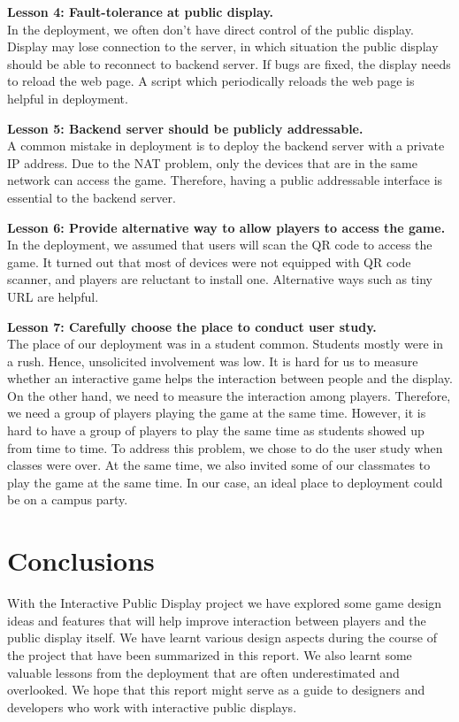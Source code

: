 \documentclass{sig-alternate}
\begin{document}
\textbf{Lesson 4: Fault-tolerance at public display.}\\
In the deployment, we often don't have direct control of the public display. Display may lose connection to the server, in which situation the public display should be able to reconnect to backend server. If bugs are fixed, the display needs to reload the web page. A script which periodically reloads the web page is helpful in deployment.

\textbf{Lesson 5: Backend server should be publicly addressable.}\\
A common mistake in deployment is to deploy the backend server with a private IP address. Due to the NAT problem, only the devices that are in the same network can access the game. Therefore, having a public addressable interface is essential to the backend server.

\textbf{Lesson 6: Provide alternative way to allow players to access the game.}\\
In the deployment, we assumed that users will scan the QR code to access the game. It turned out that most of devices were not equipped with QR code scanner, and players are reluctant to install one. Alternative ways such as tiny URL are helpful. 

\textbf{Lesson 7: Carefully choose the place to conduct user study.}\\
The place of our deployment was in a student common. Students mostly were in a rush. Hence, unsolicited involvement was low. It is hard for us to measure whether an interactive game helps the interaction between people and the display. On the other hand, we need to measure the interaction among players. Therefore, we need a group of players playing the game at the same time. However, it is hard to have a group of players to play the same time as students showed up from time to time. To address this problem, we chose to do the user study when classes were over. At the same time, we also invited some of our classmates to play the game at the same time. In our case, an ideal place to deployment could be on a campus party.

\section{Conclusions}
With the Interactive Public Display project we have explored some game design ideas and features that will help improve interaction between players and the public display itself. We have learnt various design aspects during the course of the project that have been summarized in this report. We also learnt some valuable lessons from the deployment that are often underestimated and overlooked\cite{storz:deployment_lessons}. We hope that this report might serve as a guide to designers and developers who work with interactive public displays.
\end{document}
